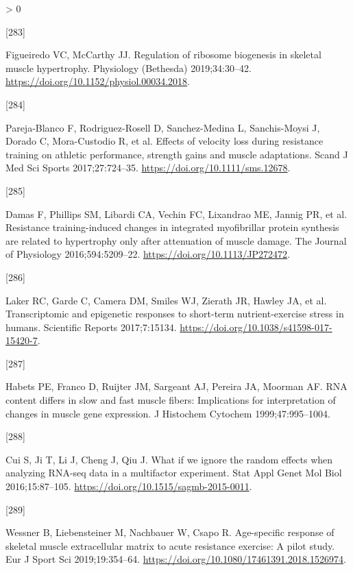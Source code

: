 \documentclass[twoside,10pt]{gihclass} %
\newlength{\cslhangindent}
\newlength{\csllabelwidth}
\newenvironment{CSLReferences}[3] %
 {%
  \setlength{\parindent}{0pt}
  \ifodd #1 \everypar{\setlength{\hangindent}{\cslhangindent}}\ignorespaces\fi
  \ifnum #2 > 0
  \setlength{\parskip}{#2\baselineskip}
  \fi
 }%
 {}
\newcommand{\CSLLeftMargin}[1]{\parbox[t]{\maxof{\widthof{#1}}{\csllabelwidth}}{#1}}
\newcommand{\CSLRightInline}[1]{\parbox[t]{\linewidth}{#1}}
\begin{document}
\begin{CSLReferences}{0}{0}
\leavevmode\hypertarget{ref-RN2142}{}%
\CSLLeftMargin{{[}283{]} }
\CSLRightInline{Figueiredo VC, McCarthy JJ. Regulation of ribosome biogenesis in skeletal muscle hypertrophy. Physiology (Bethesda) 2019;34:30--42. \url{https://doi.org/10.1152/physiol.00034.2018}.}

\leavevmode\hypertarget{ref-RN2217}{}%
\CSLLeftMargin{{[}284{]} }
\CSLRightInline{Pareja-Blanco F, Rodriguez-Rosell D, Sanchez-Medina L, Sanchis-Moysi J, Dorado C, Mora-Custodio R, et al. Effects of velocity loss during resistance training on athletic performance, strength gains and muscle adaptations. Scand J Med Sci Sports 2017;27:724--35. \url{https://doi.org/10.1111/sms.12678}.}

\leavevmode\hypertarget{ref-RN2144}{}%
\CSLLeftMargin{{[}285{]} }
\CSLRightInline{Damas F, Phillips SM, Libardi CA, Vechin FC, Lixandrao ME, Jannig PR, et al. Resistance training-induced changes in integrated myofibrillar protein synthesis are related to hypertrophy only after attenuation of muscle damage. The Journal of Physiology 2016;594:5209--22. \url{https://doi.org/10.1113/JP272472}.}

\leavevmode\hypertarget{ref-RN2401}{}%
\CSLLeftMargin{{[}286{]} }
\CSLRightInline{Laker RC, Garde C, Camera DM, Smiles WJ, Zierath JR, Hawley JA, et al. Transcriptomic and epigenetic responses to short-term nutrient-exercise stress in humans. Scientific Reports 2017;7:15134. \url{https://doi.org/10.1038/s41598-017-15420-7}.}

\leavevmode\hypertarget{ref-RN1707}{}%
\CSLLeftMargin{{[}287{]} }
\CSLRightInline{Habets PE, Franco D, Ruijter JM, Sargeant AJ, Pereira JA, Moorman AF. RNA content differs in slow and fast muscle fibers: Implications for interpretation of changes in muscle gene expression. J Histochem Cytochem 1999;47:995--1004.}

\leavevmode\hypertarget{ref-RN2366}{}%
\CSLLeftMargin{{[}288{]} }
\CSLRightInline{Cui S, Ji T, Li J, Cheng J, Qiu J. What if we ignore the random effects when analyzing RNA-seq data in a multifactor experiment. Stat Appl Genet Mol Biol 2016;15:87--105. \url{https://doi.org/10.1515/sagmb-2015-0011}.}

\leavevmode\hypertarget{ref-RN2451}{}%
\CSLLeftMargin{{[}289{]} }
\CSLRightInline{Wessner B, Liebensteiner M, Nachbauer W, Csapo R. Age-specific response of skeletal muscle extracellular matrix to acute resistance exercise: A pilot study. Eur J Sport Sci 2019;19:354--64. \url{https://doi.org/10.1080/17461391.2018.1526974}.}


\end{CSLReferences}
\end{document}
